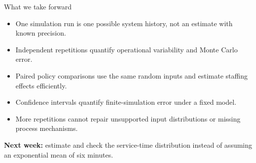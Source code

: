 \documentclass{beamer}
\begin{document}
\begin{frame}{What we take forward}
  \begin{itemize}
    \item One simulation run is one possible system history, not an estimate with known precision.
    \item Independent repetitions quantify operational variability and Monte Carlo error.
    \item Paired policy comparisons use the same random inputs and estimate staffing effects efficiently.
    \item Confidence intervals quantify finite-simulation error under a fixed model.
    \item More repetitions cannot repair unsupported input distributions or missing process mechanisms.
  \end{itemize}

  \vspace{0.7em}
  \textbf{Next week:} estimate and check the service-time distribution instead of assuming an exponential mean of six minutes.
\end{frame}
\end{document}
